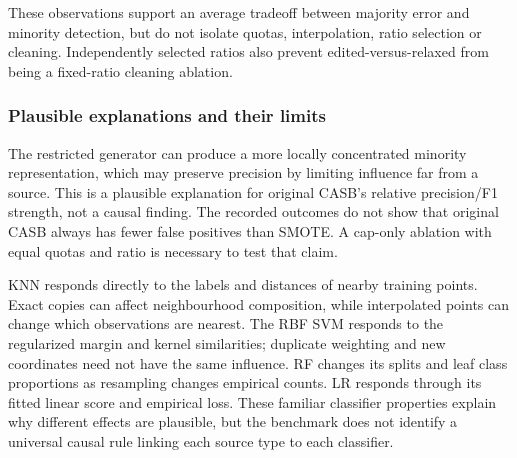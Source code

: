 \documentclass[conference]{IEEEtran}
\begin{document}
These observations support an average tradeoff between majority error and minority detection, but do not isolate quotas, interpolation, ratio selection or cleaning. Independently selected ratios also prevent edited-versus-relaxed from being a fixed-ratio cleaning ablation.
\begin{table}[!htbp]
\centering\small
\caption{Observed error-rate changes (percentage points) for edited minus original CASB, on 40 datasets. Removal is the mean percentage of original majority training observations removed by edited. These paired pipeline comparisons are not component ablations.}\label{tab:mechanisms}
\end{table}

\subsubsection{Plausible explanations and their limits}
The restricted generator can produce a more locally concentrated minority representation, which may preserve precision by limiting influence far from a source. This is a plausible explanation for original CASB's relative precision/F1 strength, not a causal finding. The recorded outcomes do not show that original CASB always has fewer false positives than SMOTE. A cap-only ablation with equal quotas and ratio is necessary to test that claim.

KNN responds directly to the labels and distances of nearby training points. Exact copies can affect neighbourhood composition, while interpolated points can change which observations are nearest. The RBF SVM responds to the regularized margin and kernel similarities; duplicate weighting and new coordinates need not have the same influence. RF changes its splits and leaf class proportions as resampling changes empirical counts. LR responds through its fitted linear score and empirical loss. These familiar classifier properties explain why different effects are plausible, but the benchmark does not identify a universal causal rule linking each source type to each classifier.
\end{document}
